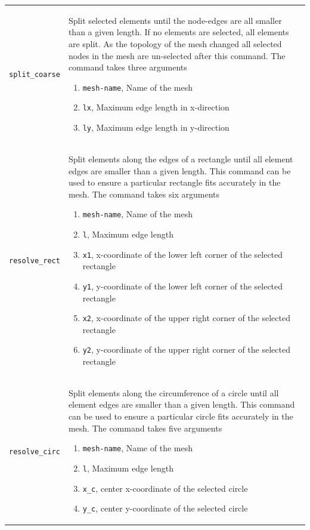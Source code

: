 \documentclass[noshowpacs,preprintnumbers,amsmath,amssymb, letter]{revtex4}
\begin{document}
\begin{longtable}{p{}p{}}
\texttt{split\_coarse}	& Split selected elements until the node-edges are all smaller than a given length. If no elements are selected, all elements are split. As the topology of the mesh changed all selected nodes in the mesh are un-selected after this command. The command takes three arguments 
\begin{enumerate}
\item \texttt{mesh-name}, Name of the mesh
\item \texttt{lx}, Maximum edge length in x-direction
\item \texttt{ly}, Maximum edge length in y-direction
\end{enumerate}\\
\texttt{resolve\_rect}	& Split elements along the edges of a rectangle until all element edges are smaller than a given length. This command can be used to ensure a particular rectangle fits accurately in the mesh. The command takes six arguments 
\begin{enumerate}
\item \texttt{mesh-name}, Name of the mesh
\item \texttt{l}, Maximum edge length
\item \texttt{x1}, x-coordinate of the lower left corner of the selected rectangle
\item \texttt{y1}, y-coordinate of the lower left corner of the selected rectangle
\item \texttt{x2}, x-coordinate of the upper right corner of the selected rectangle
\item \texttt{y2}, y-coordinate of the upper right corner of the selected rectangle
\end{enumerate}\\
\texttt{resolve\_circ}	& Split elements along the circumference of a circle until all element edges are smaller than a given length. This command can be used to ensure a particular circle fits accurately in the mesh. The command takes five arguments 
\begin{enumerate}
\item \texttt{mesh-name}, Name of the mesh
\item \texttt{l}, Maximum edge length
\item \texttt{x\_c}, center x-coordinate of the selected circle
\item \texttt{y\_c}, center y-coordinate of the selected circle

\end{enumerate}
\end{longtable}
\end{document}
